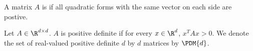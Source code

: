 


A matrix $A$ is 
if all quadratic forms with the
same vector on each side are postive.


Let $A \in \R^{d \times d}$. $A$
is positive definite if for every
$x \in \R^d$, $x^T A x > 0$.
We denote the set of real-valued
positive definite $d$ by $d$
matrices by $\PDM{d}$.
